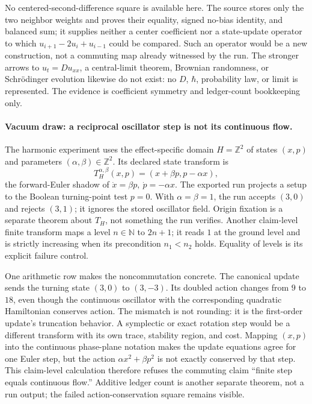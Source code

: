 No centered-second-difference square is available here.  The source stores only the two neighbor weights and proves
their equality, signed no-bias identity, and balanced sum; it supplies neither a center coefficient nor a state-update
operator to which \(u_{i+1}-2u_i+u_{i-1}\) could be compared.  Such an operator would be a new construction, not a
commuting map already witnessed by the run.  The stronger arrows to \(u_t=D u_{xx}\), a central-limit theorem,
Brownian randomness, or Schr\"odinger evolution likewise do not exist: no \(D\), \(\hbar\), probability law, or limit
is represented.  The evidence is coefficient symmetry and ledger-count bookkeeping only.

\paragraph{Vacuum draw: a reciprocal oscillator step is not its continuous flow.}
The harmonic experiment uses the effect-specific domain
\(H=\mathbb Z^2\) of states \((x,p)\) and parameters \((\alpha,\beta)\in\mathbb Z^2\).  Its declared state transform is
\[
 T_H^{\alpha,\beta}(x,p)=(x+\beta p, p-\alpha x),
\]
the forward-Euler shadow of \(\dot x=\beta p,\ \dot p=-\alpha x\).  The exported run projects a setup to the Boolean
turning-point test \(p=0\).  With \(\alpha=\beta=1\), the run accepts \((3,0)\) and rejects \((3,1)\); it ignores the
stored oscillator field.  Origin fixation is a separate theorem about \(T_H\), not something the run verifies.  Another
claim-level finite transform maps a level \(n\in\mathbb N\) to \(2n+1\); it reads \(1\) at the ground level and is
strictly increasing when its precondition \(n_1<n_2\) holds.  Equality of levels is its explicit failure control.

One arithmetic row makes the noncommutation concrete.  The canonical update sends the turning state
\((3,0)\) to \((3,-3)\).  Its doubled action changes from \(9\) to \(18\), even though the continuous oscillator with
the corresponding quadratic Hamiltonian conserves action.  The mismatch is not rounding: it is the first-order
update's truncation behavior.  A symplectic or exact rotation step would be a different transform with its own trace,
stability region, and cost.
Mapping \((x,p)\) into the continuous phase-plane notation makes the update equations agree for one Euler step, but
the action \(\alpha x^2+\beta p^2\) is not exactly conserved by that step.  This claim-level calculation therefore
refuses the commuting claim ``finite step equals continuous flow.''  Additive ledger count is another separate
theorem, not a run output; the failed action-conservation square remains visible.

